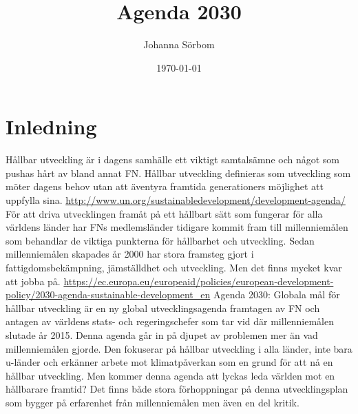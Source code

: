 \documentclass{report}
\title{Agenda 2030}
\date{\today}
\author{Johanna Sörbom}
\begin{document}
\maketitle
\newpage
\tableofcontents
\newpage
\section{Inledning}
Hållbar utveckling är i dagens samhälle ett viktigt samtalsämne och något som pushas hårt av bland annat FN. Hållbar utveckling definieras som utveckling som möter dagens behov utan att äventyra framtida generationers möjlighet att uppfylla sina.  \url{http://www.un.org/sustainabledevelopment/development-agenda/}
För att driva utvecklingen framåt på ett hållbart sätt som fungerar för alla världens länder har FNs medlemsländer tidigare kommit fram till millenniemålen som behandlar de viktiga punkterna för hållbarhet och utveckling.  Sedan millenniemålen skapades år 2000 har stora framsteg gjort i fattigdomsbekämpning, jämställdhet och utveckling. Men det finns mycket kvar att jobba på. \url{https://ec.europa.eu/europeaid/policies/european-development-policy/2030-agenda-sustainable-development_en}
Agenda 2030: Globala mål för hållbar utveckling är en ny global utvecklingsagenda framtagen av FN och antagen av världens stats- och regeringschefer som tar vid där millenniemålen slutade år 2015. Denna agenda går in på djupet av problemen mer än vad millenniemålen gjorde. Den fokuserar på hållbar utveckling i alla länder, inte bara u-länder och erkänner arbete mot klimatpåverkan som en grund för att nå en hållbar utveckling. Men kommer denna agenda att lyckas leda världen mot en hållbarare framtid? Det finns både stora förhoppningar på denna utvecklingsplan som bygger på erfarenhet från millenniemålen men även en del kritik. 
\end{document}

